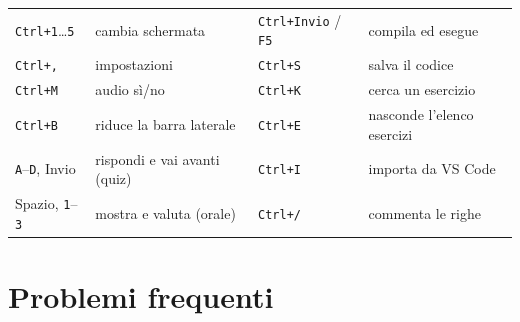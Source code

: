 \begin{center}\small
\begin{tabular}{ll@{\qquad}ll}
\toprule
\texttt{Ctrl+1}\ldots\texttt{5} & cambia schermata & \texttt{Ctrl+Invio} / \texttt{F5} & compila ed esegue \\
\texttt{Ctrl+,} & impostazioni & \texttt{Ctrl+S} & salva il codice \\
\texttt{Ctrl+M} & audio sì/no & \texttt{Ctrl+K} & cerca un esercizio \\
\texttt{Ctrl+B} & riduce la barra laterale & \texttt{Ctrl+E} & nasconde l'elenco esercizi \\
\texttt{A}--\texttt{D}, Invio & rispondi e vai avanti (quiz) & \texttt{Ctrl+I} & importa da VS Code \\
Spazio, \texttt{1}--\texttt{3} & mostra e valuta (orale) & \texttt{Ctrl+/} & commenta le righe \\
\bottomrule
\end{tabular}
\end{center}

\section*{Problemi frequenti}

